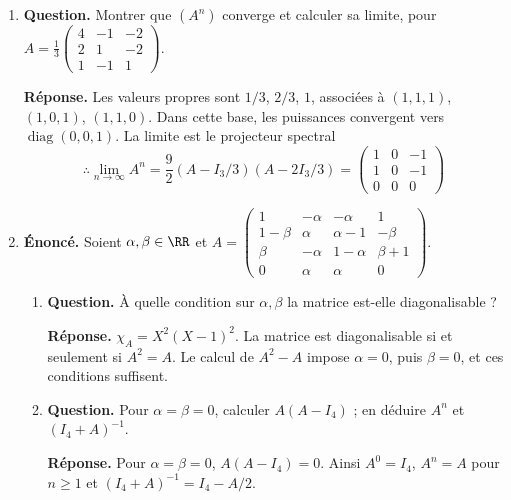 \documentclass[12pt, a4paper]{article}
\begin{document}
\begin{enumerate}[label=9.\arabic*., start=94]
  \item \begin{minipage}[t]{\linewidth}\raggedright
\textbf{Question.} Montrer que $(A^n)$ converge et calculer sa limite, pour $A=\frac13\begin{pmatrix}4&-1&-2\\2&1&-2\\1&-1&1\end{pmatrix}$.
\par\smallskip
\textbf{Réponse.} Les valeurs propres sont $1/3$, $2/3$, $1$, associées à $(1,1,1)$, $(1,0,1)$, $(1,1,0)$.
    Dans cette base, les puissances convergent vers $\operatorname{diag}(0,0,1)$.
    La limite est le projecteur spectral
    \[
      \therefore\lim_{n\to\infty}A^n=\frac92(A-I_3/3)(A-2I_3/3)=\begin{pmatrix}1&0&-1\\1&0&-1\\0&0&0\end{pmatrix}
    \]
\end{minipage}

  \item \begin{minipage}[t]{\linewidth}\raggedright
\textbf{Énoncé.} Soient $\alpha,\beta\in\RR$ et $\displaystyle A=\begin{pmatrix}1&-\alpha&-\alpha&1\\1-\beta&\alpha&\alpha-1&-\beta\\\beta&-\alpha&1-\alpha&\beta+1\\0&\alpha&\alpha&0\end{pmatrix}$.

\begin{enumerate}[\arabic*.]
        \item \textbf{Question.} À quelle condition sur $\alpha,\beta$ la matrice est-elle diagonalisable ?
\par\smallskip
\textbf{Réponse.} $\chi_A=X^2(X-1)^2$. La matrice est diagonalisable si et seulement si $A^2=A$.
        Le calcul de $A^2-A$ impose $\alpha=0$, puis $\beta=0$, et ces conditions suffisent.

  \item \textbf{Question.} Pour $\alpha=\beta=0$, calculer $A(A-I_4)$ ; en déduire $A^n$ et $(I_4+A)^{-1}$.
\par\smallskip
\textbf{Réponse.} Pour $\alpha=\beta=0$, $A(A-I_4)=0$.
        Ainsi $A^0=I_4$, $A^n=A$ pour $n\geq1$ et $(I_4+A)^{-1}=I_4-A/2$.

\end{enumerate}
\end{minipage}


\end{enumerate}
\end{document}
